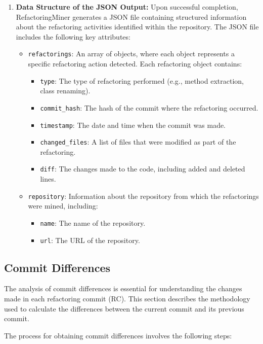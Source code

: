 \documentclass[sigconf]{acmart}
\begin{document}
\begin{enumerate}
    \item \textbf{Data Structure of the JSON Output:} Upon successful completion, RefactoringMiner generates a JSON file containing structured information about the refactoring activities identified within the repository. The JSON file includes the following key attributes:
        \begin{itemize}
        \item \texttt{refactorings}: An array of objects, where each object represents a specific refactoring action detected. Each refactoring object contains:
        \begin{itemize}
            \item \texttt{type}: The type of refactoring performed (e.g., method extraction, class renaming).
            \item \texttt{commit\_hash}: The hash of the commit where the refactoring occurred.
            \item \texttt{timestamp}: The date and time when the commit was made.
            \item \texttt{changed\_files}: A list of files that were modified as part of the refactoring.
            \item \texttt{diff}: The changes made to the code, including added and deleted lines.
        \end{itemize}
        \item \texttt{repository}: Information about the repository from which the refactorings were mined, including:
        \begin{itemize}
            \item \texttt{name}: The name of the repository.
            \item \texttt{url}: The URL of the repository.
        \end{itemize}
    \end{itemize}
\end{enumerate}

\subsection{Commit Differences}
The analysis of commit differences is essential for understanding the changes made in each refactoring commit (RC). This section describes the methodology used to calculate the differences between the current commit and its previous commit.

The process for obtaining commit differences involves the following steps:
\end{document}
